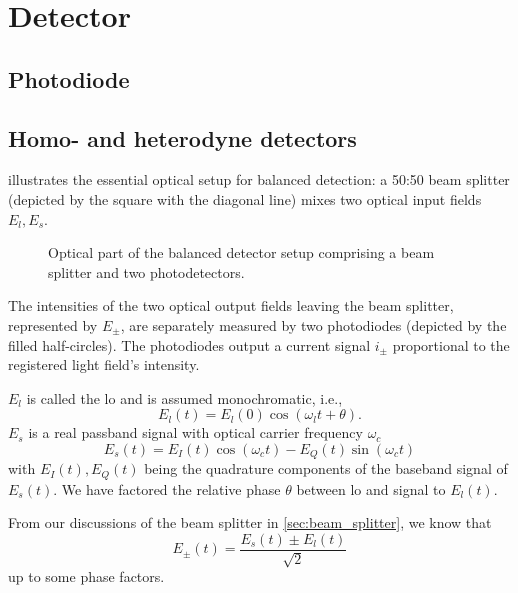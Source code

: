 \section{Detector}

\cite{Bruschi2013} %

\subsection{Photodiode}

\subsection{Homo- and heterodyne detectors}

 illustrates the essential optical setup for balanced detection:
a 50:50 beam splitter (depicted by the square with the diagonal line) mixes two optical input fields $E_l,E_s$.
\begin{figure}[htb]
    \centering
    
    \caption{Optical part of the balanced detector setup comprising a beam splitter and two photodetectors.}\label{fig:balanced_detector_optics}
\end{figure}
The intensities of the two optical output fields leaving the beam splitter, represented by $E_\pm$, are separately measured by two photodiodes (depicted by the filled half-circles).
The photodiodes output a current signal $i_\pm$ proportional to the registered light field's intensity.

$E_l$ is called the \gls{lo} and is assumed monochromatic, i.e.,
\begin{equation}
    E_l(t)
    =
    E_l(0)\cos(\omega_l t+\theta)
    \label{eq:efield_lo}.
\end{equation}
$E_s$ is a real passband signal with optical carrier frequency $\omega_c$
\begin{equation}
    E_s(t)
    =
    E_I(t)\cos(\omega_c t)-E_Q(t)\sin(\omega_c t)
    \label{eq:efield_signal}
\end{equation}
with $E_I(t),E_Q(t)$ being the quadrature components of the baseband signal of $E_s(t)$.
We have factored the relative phase $\theta$ between \gls{lo} and signal to $E_l(t)$.

From our discussions of the beam splitter in \cref{sec:beam_splitter}, we know that
\begin{equation}
    E_\pm(t)
    =
    \frac{E_s(t)\pm E_l(t)}{\sqrt{2}}
\end{equation}
up to some phase factors.

